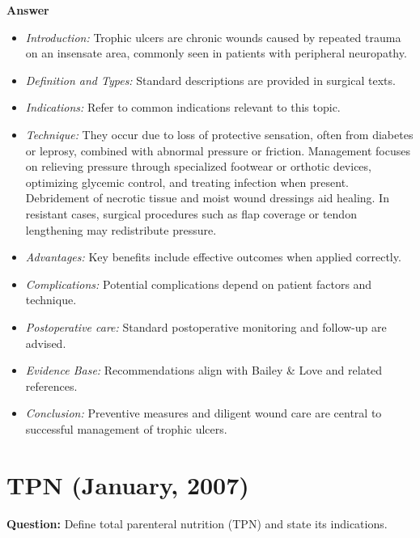 \documentclass{article}
\begin{document}
\textbf{Answer}
\begin{itemize}

\item \emph{Introduction:} Trophic ulcers are chronic wounds caused by repeated trauma on an insensate area, commonly seen in patients with peripheral neuropathy.
\item \emph{Definition and Types:} Standard descriptions are provided in surgical texts.
\item \emph{Indications:} Refer to common indications relevant to this topic.

\item \emph{Technique:} They occur due to loss of protective sensation, often from diabetes or leprosy, combined with abnormal pressure or friction. Management focuses on relieving pressure through specialized footwear or orthotic devices, optimizing glycemic control, and treating infection when present. Debridement of necrotic tissue and moist wound dressings aid healing. In resistant cases, surgical procedures such as flap coverage or tendon lengthening may redistribute pressure.
\item \emph{Advantages:} Key benefits include effective outcomes when applied correctly.
\item \emph{Complications:} Potential complications depend on patient factors and technique.
\item \emph{Postoperative care:} Standard postoperative monitoring and follow-up are advised.
\item \emph{Evidence Base:} Recommendations align with Bailey \& Love and related references.

\item \emph{Conclusion:} Preventive measures and diligent wound care are central to successful management of trophic ulcers.


\end{itemize}

\section{TPN (January, 2007)}

\textbf{Question:} Define total parenteral nutrition (TPN) and state its indications.
\end{document}
